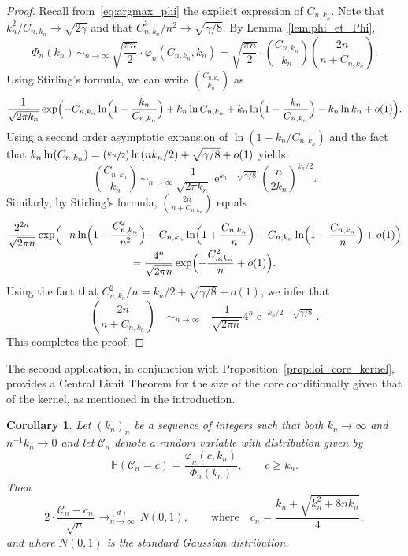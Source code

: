 \documentclass[11pt]{article}
\newcommand{\Psfrac}[2]{(\sfrac{#1}{#2})}
\theoremstyle{plain}
\newtheorem{corollary}[theorem]{Corollary}
\theoremstyle{definition}
\theoremstyle{remark}
\renewcommand{\P}{\mathbb{P}}
\newcommand{\e}{\operatorname{e}}
\newcommand{\cvloi}[1][n]{\,\mathop{\longrightarrow}^{(d)}_{#1 \to \infty}\,}
\begin{document}
\begin{proof}
Recall from~\eqref{eq:argmax_phi} the explicit expression of $C_{n,k_{n}}$. Note that $k_{n}^{2}/C_{n,k_{n}} \rightarrow \sqrt{2 \gamma}$ and that $C_{n,k_n}^{3}/n^{2} \rightarrow \sqrt{\gamma/8}$. By Lemma~\ref{lem:phi_et_Phi},\vspace*{-3pt}
\[
\Phi_{n}(k_{n}) \, \mathop{\sim}_{n \rightarrow \infty} \, \sqrt{ \frac{\pi n}{2}} \cdot \varphi_{n}(C_{n,k_n},k_n)= \sqrt{ \frac{\pi n}{2}} \cdot \binom{C_{n,k_{n}}}{k_{n}} \binom{2n}{n+C_{n,k_{n}}}.
\]
Using Stirling's formula, we can write $ \binom{C_{n,k_{n}}}{k_{n}}$ as\vspace*{-3pt}
\[
\frac{1}{\sqrt{2 \pi k_{n}}} \exp \Bigl(-C_{n,k_n} \ln \Bigl(1- \frac{k_{n}}{C_{n,k_n}}\Bigr)+ k_{n} \ln C_{n,k_n}+ k_{n} \ln \Bigl(1- \frac{k_{n}}{C_{n,k_n}}\Bigr)-k_{n} \ln k_{n} +o(1) \Bigr).
\]
Using a second order asymptotic expansion of $\ln(1-k_{n}/C_{n,k_n})$ and the fact that $k_{n }\ln(C_{n,k_{n}})= \Psfrac{k_{n}}{2} \ln(n k_{n}/2)+\sqrt{\gamma/8}+o(1)$ yields\vspace*{-3pt}
\[
\binom{C_{n,k_{n}}}{k_{n}} \, \mathop{\sim}_{n \rightarrow \infty} \, \frac{1}{\sqrt{2 \pi k_{n}}} \e^{k_{n}-\sqrt{\gamma/8}} \left(\frac{n}{2 k_{n}}\right)^{k_{n}/2}.
\]
Similarly, by Stirling's formula,
$\binom{2n}{n+C_{n,k_{n}}}$ equals\vspace*{-5pt}
\begin{multline*}
\frac{2^{2n}}{\sqrt{ 2 \pi n}} \exp \Bigl(-n \ln \Bigl(1- \frac{C_{n,k_n}^{2}}{n^{2}} \Bigr)-C_{n,k_n}\ln \Bigl(1+ \frac{C_{n,k_n}}{n} \Bigr) + C_{n,k_n}\ln \Bigl(1- \frac{C_{n,k_n}}{n}\Bigr)+o(1)\Bigr)
\\[-3pt]
= \frac{4^n}{\sqrt{ 2 \pi n}} \exp \Bigl(- \frac{C_{n,k_n}^{2}}{n}+o(1) \Bigr).
\end{multline*}
Using the fact that $C_{n,k_n}^{2}/n=k_{n}/2+ \sqrt{\gamma/8}+o(1)$, we infer that
\[
\binom{2n}{n+C_{n,k_{n}}} \quad \mathop{\sim}_{n \rightarrow \infty} \quad \frac{1}{\sqrt{ 2 \pi n}} 4^{n} \e^{-k_{n}/2-\sqrt{\gamma/8}}.
\]
This completes the proof.
\end{proof}

The second application, in conjunction with Proposition~\ref{prop:loi_core_kernel}, provides a Central Limit Theorem for the size of the core conditionally given that of the kernel, as mentioned in the introduction.

\begin{corollary}\label{cor:TCL_core}
Let $(k_n)_n$ be a sequence of integers such that both $k_n \to \infty$ and $n^{-1} k_n\to0$ and let $\mathcal{C}_{n}$ denote a random variable with distribution given by\vspace*{-3pt}
\[
\P(\mathcal{C}_{n}=c)= \frac{\varphi_{n}(c,k_{n})}{ \Phi_{n}(k_{n})}, \qquad c \geq k_{n}.
\]
Then\vspace*{-3pt}
\[
2 \cdot \frac{ \mathcal{C}_{n}-c_n}{ \sqrt{n}} \cvloi N(0,1),
\qquad\text{where}\quad
c_n = \frac{k_n + \sqrt{k_n^{2} + 8 n k_n }}{4} ,
\]
and where $N(0,1)$ is the standard Gaussian distribution.
\end{corollary}
\end{document}
